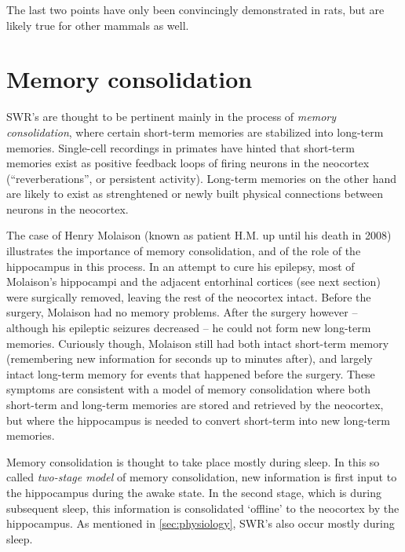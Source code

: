 The last two points have only been convincingly demonstrated in rats, but are likely true for other mammals as well.




\section{Memory consolidation}

SWR's are thought to be pertinent mainly in the process of \emph{memory consolidation}, where certain short-term memories are stabilized into long-term memories. Single-cell recordings in primates have hinted that short-term memories exist as positive feedback loops of firing neurons in the neocortex (``reverberations'', or persistent activity). Long-term memories on the other hand are likely to exist as strenghtened or newly built physical connections between neurons in the neocortex. \cite{Kandel2013,Bear2015}

The case of Henry Molaison (known as patient H.M. up until his death in 2008) illustrates the importance of memory consolidation, and of the role of the hippocampus in this process. In an attempt to cure his epilepsy, most of Molaison's hippocampi and the adjacent entorhinal cortices (see next section) were surgically removed, leaving the rest of the neocortex intact. Before the surgery, Molaison had no memory problems. After the surgery however -- although his epileptic seizures decreased -- he could not form new long-term memories.\footnotemark{} Curiously though, Molaison still had both intact short-term memory (remembering new information for seconds up to minutes after), and largely intact long-term memory for events that happened before the surgery. These symptoms are consistent with a model of memory consolidation where both short-term and long-term memories are stored and retrieved by the neocortex, but where the hippocampus is needed to convert short-term into new long-term memories. \cite{Kandel2013}


Memory consolidation is thought to take place mostly during sleep. In this so called \emph{two-stage model} of memory consolidation, new information is first input to the hippocampus during the awake state. In the second stage, which is during subsequent sleep, this information is consolidated `offline' to the neocortex by the hippocampus. As mentioned in \cref{sec:physiology}, SWR's also occur mostly during sleep.





